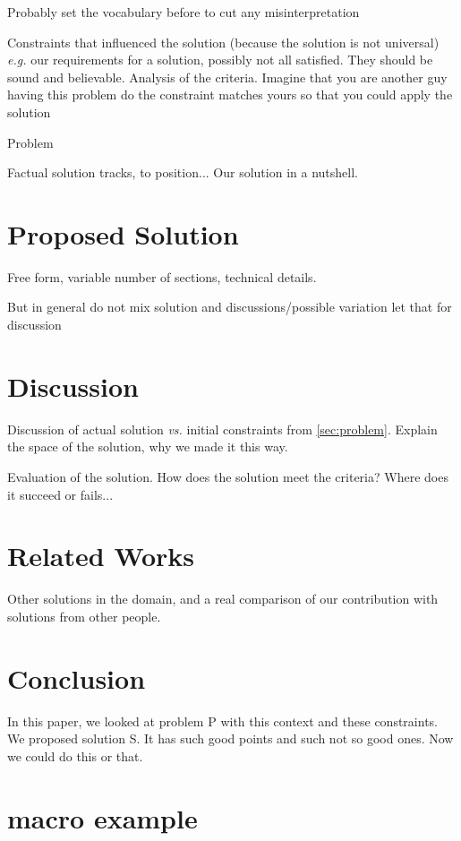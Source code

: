 \documentclass{article}
\begin{document}
Probably set the vocabulary before to cut any misinterpretation

Constraints that influenced the solution (because the solution is not
universal) \emph{e.g.} our requirements for a solution, possibly not all
satisfied. They should be sound and believable. Analysis of the criteria.
Imagine that you are another guy having this problem do the constraint
matches yours so that you could apply the solution

Problem

Factual solution tracks, to position...
Our solution in a nutshell.


\section{Proposed Solution}
\label{sec:contribution}

Free form, variable number of sections, technical details.

But in general do not mix solution and discussions/possible variation
let that for discussion

\section{Discussion}
\label{sec:discussion}

Discussion of actual solution \emph{vs.} initial constraints from
\ref{sec:problem}. Explain the space of the solution, why we made it this way.

Evaluation of the solution. How does the solution meet the criteria? Where
does it succeed or fails...


\section{Related Works}
\label{sec:related}

Other solutions in the domain, and a real comparison of our contribution with
solutions from other people.


\section{Conclusion}
\label{sec:conclusion}

In this paper, we \textsf{looked}\xspace at problem P with this context and these
constraints. We proposed solution S. It has such good points and such not so
good ones. Now we could do this or that.


\section*{macro example}
\end{document}
